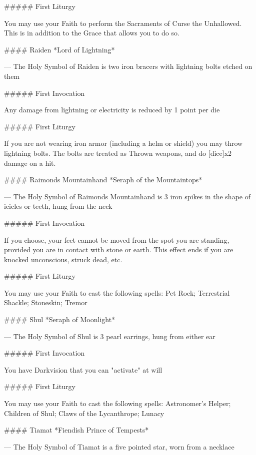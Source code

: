 ##### First Liturgy

You may use your Faith to perform the Sacraments of Curse the Unhallowed.  This is in addition to the Grace that allows you to do so.




#### Raiden
*Lord of Lightning*

---
The Holy Symbol of Raiden is two iron bracers with lightning bolts etched on them

##### First Invocation

Any damage from lightning or electricity is reduced by 1 point per die

##### First Liturgy

If you are not wearing iron armor (including a helm or shield) you may throw lightning bolts.  The bolts are treated as Thrown weapons, and do [dice]x2 damage on a hit.




#### Raimonds Mountainhand
*Seraph of the Mountaintops*

---
The Holy Symbol of Raimonds Mountainhand is 3 iron spikes in the shape of icicles or teeth, hung from the neck

##### First Invocation

If you choose, your feet cannot be moved from the spot you are standing, provided you are in contact with stone or earth. This effect ends if you are knocked unconscious, struck dead, etc.

##### First Liturgy

You may use your Faith to cast the following spells: Pet Rock; Terrestrial Shackle; Stoneskin; Tremor





#### Shul
*Seraph of Moonlight*

---
The Holy Symbol of Shul is 3 pearl earrings, hung from either ear

##### First Invocation

You have Darkvision that you can "activate" at will

##### First Liturgy

You may use your Faith to cast the following spells: Astronomer's Helper; Children of Shul; Claws of the Lycanthrope; Lunacy




#### Tiamat
*Fiendish Prince of Tempests*

---
The Holy Symbol of Tiamat is a five pointed star, worn from a necklace

